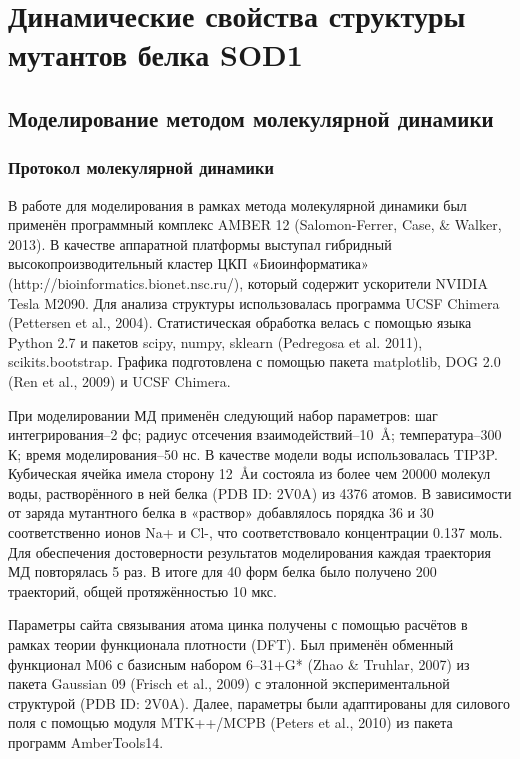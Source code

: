 \chapter{Динамические свойства структуры мутантов белка SOD1} \label{chapt2}

\section{Моделирование методом молекулярной динамики} \label{sect_MD}

\subsection{Протокол молекулярной динамики} \label{subsect_MD_protocol}

В работе для моделирования в рамках метода молекулярной динамики был применён программный комплекс AMBER 12 (Salomon-Ferrer, Case, \& Walker, 2013). В качестве аппаратной платформы выступал гибридный высокопроизводительный кластер ЦКП «Биоинформатика» (http://bioinformatics.bionet.nsc.ru/), который содержит ускорители NVIDIA Tesla M2090. Для анализа структуры использовалась программа UCSF Chimera (Pettersen et al., 2004). Статистическая обработка велась с помощью языка Python 2.7 и пакетов scipy, numpy, sklearn (Pedregosa et al. 2011), scikits.bootstrap. Графика подготовлена с помощью пакета matplotlib, DOG 2.0 (Ren et al., 2009) и UCSF Chimera.

При моделировании МД применён следующий набор параметров: шаг интегрирования--2 фс; радиус отсечения взаимодействий--10~\AA; температура--300 К; время моделирования--50 нс. В качестве модели воды использовалась TIP3P. Кубическая ячейка имела сторону 12~\AA и состояла из более чем 20000 молекул воды, растворённого в ней белка (PDB ID: 2V0A) из 4376 атомов. В зависимости от заряда мутантного белка в «раствор» добавлялось порядка 36 и 30 соответственно ионов Na+ и Cl-, что соответствовало концентрации 0.137 моль.  Для обеспечения достоверности результатов моделирования каждая траектория МД повторялась 5 раз. В итоге для 40 форм белка было получено 200 траекторий, общей протяжённостью  10 мкс.

Параметры сайта связывания атома цинка получены с помощью расчётов в рамках теории функционала плотности (DFT). Был применён обменный функционал M06 с базисным набором 6–31+G* (Zhao \& Truhlar, 2007) из пакета Gaussian 09 (Frisch et al., 2009) с эталонной экспериментальной структурой (PDB ID: 2V0A). Далее, параметры были адаптированы для силового поля с помощью модуля MTK++/MCPB (Peters et al., 2010) из пакета программ AmberTools14.

